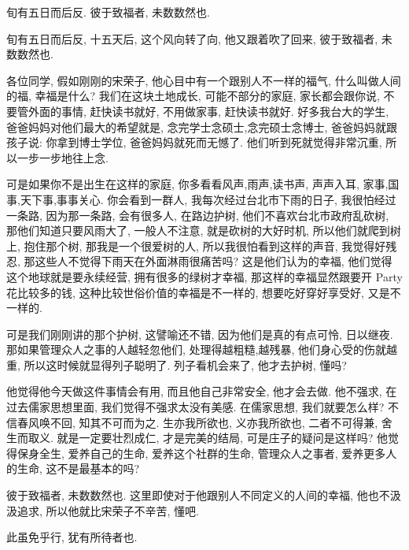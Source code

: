\documentclass[11pt]{article}
\begin{document}
\begin{center}
	{\color{magenta} 旬有五日而后反. 彼于致福者, 未数数然也.}
\end{center}

\vspace{-0.5cm}

{\color{blue} 旬有五日而后反}, 十五天后, 这个风向转了向, 他又跟着吹了回来, {\color{blue} 彼于致福者, 未数数然也}.

各位同学, 假如刚刚的宋荣子, 他心目中有一个跟别人不一样的福气, 什么叫做人间的福, 幸福是什么? 我们在这块土地成长, 可能不部分的家庭, 家长都会跟你说, 不要管外面的事情, 赶快读书就好, 不用做家事, 赶快读书就好. 好多我台大的学生, 爸爸妈妈对他们最大的希望就是, 念完学士念硕士,念完硕士念博士, 爸爸妈妈就跟孩子说: 你拿到博士学位, 爸爸妈妈就死而无憾了. 他们听到死就觉得非常沉重, 所以一步一步地往上念.

可是如果你不是出生在这样的家庭, 你多看看风声,雨声,读书声, 声声入耳, 家事,国事,天下事,事事关心. 你会看到一群人, 我每次经过台北市下雨的日子, 我很怕经过一条路, 因为那一条路, 会有很多人, 在路边护树, 他们不喜欢台北市政府乱砍树, 那他们知道只要风雨大了, 一般人不注意, 就是砍树的大好时机, 所以他们就爬到树上, 抱住那个树, 那我是一个很爱树的人, 所以我很怕看到这样的声音, 我觉得好残忍, 那这些人不觉得下雨天在外面淋雨很痛苦吗? 这是他们认为的幸福, 他们觉得这个地球就是要永续经营, 拥有很多的绿树才幸福, 那这样的幸福显然跟要开 Party 花比较多的钱, 这种比较世俗价值的幸福是不一样的, 想要吃好穿好享受好, 又是不一样的.

可是我们刚刚讲的那个护树, 这譬喻还不错, 因为他们是真的有点可怜, 日以继夜. 那如果管理众人之事的人越轻忽他们, 处理得越粗糙,越残暴, 他们身心受的伤就越重, 所以这时候就显得列子聪明了. 列子看机会来了, 他才去护树, 懂吗? 

他觉得他今天做这件事情会有用, 而且他自己非常安全, 他才会去做. 他不强求, 在过去儒家思想里面, 我们觉得不强求太没有美感. 在儒家思想, 我们就要怎么样? 不信春风唤不回, 知其不可而为之. 生亦我所欲也, 义亦我所欲也, 二者不可得兼, 舍生而取义. 就是一定要壮烈成仁, 才是完美的结局, 可是庄子的疑问是这样吗? 他觉得保身全生, 爱养自己的生命, 爱养这个社群的生命, 管理众人之事者, 爱养更多人的生命, 这不是最基本的吗? 

{\color{blue} 彼于致福者, 未数数然也}. 这里即使对于他跟别人不同定义的人间的幸福, 他也不汲汲追求, 所以他就比宋荣子不辛苦, 懂吧.

\begin{center}
	{\color{magenta} 此虽免乎行, 犹有所待者也.}
\end{center}

\vspace{-0.5cm}
\end{document}
